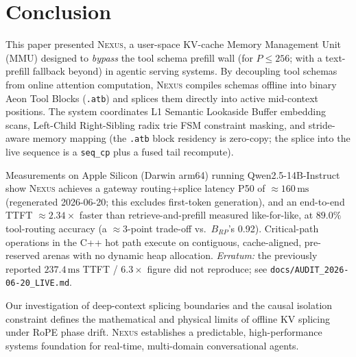 \section{Conclusion}
\label{sec:conclusion}

This paper presented \textsc{Nexus}, a user-space KV-cache Memory Management Unit (MMU) designed to \emph{bypass} the tool schema prefill wall (for $P \le 256$; with a text-prefill fallback beyond) in agentic serving systems. By decoupling tool schemas from online attention computation, \textsc{Nexus} compiles schemas offline into binary Aeon Tool Blocks (\texttt{.atb}) and splices them directly into active mid-context positions. The system coordinates L1 Semantic Lookaside Buffer embedding scans, Left-Child Right-Sibling radix trie FSM constraint masking, and stride-aware memory mapping (the \texttt{.atb} block residency is zero-copy; the splice into the live sequence is a \texttt{seq\_cp} plus a fused tail recompute).

Measurements on Apple Silicon (Darwin arm64) running Qwen2.5-14B-Instruct show \textsc{Nexus} achieves a gateway routing+splice latency P50 of $\approx 160\,\text{ms}$ (regenerated 2026-06-20; this excludes first-token generation), and an end-to-end TTFT $\approx 2.34\times$ faster than retrieve-and-prefill measured like-for-like, at $89.0\%$ tool-routing accuracy (a $\approx 3$-point trade-off vs.\ $B_{RP}$'s 0.92). Critical-path operations in the C++ hot path execute on contiguous, cache-aligned, pre-reserved arenas with no dynamic heap allocation. \emph{Erratum:} the previously reported $237.4\,\text{ms}$ TTFT / $6.3\times$ figure did not reproduce; see \texttt{docs/AUDIT\_2026-06-20\_LIVE.md}.

Our investigation of deep-context splicing boundaries and the causal isolation constraint defines the mathematical and physical limits of offline KV splicing under RoPE phase drift. \textsc{Nexus} establishes a predictable, high-performance systems foundation for real-time, multi-domain conversational agents.
